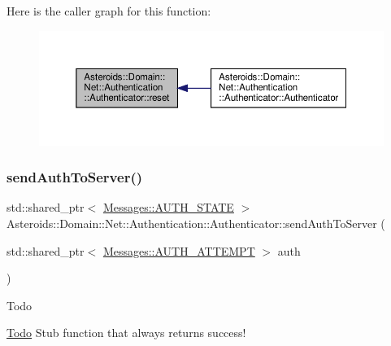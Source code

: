 Here is the caller graph for this function\+:\nopagebreak
\begin{figure}[H]
\begin{center}
\leavevmode
\includegraphics[width=350pt]{classAsteroids_1_1Domain_1_1Net_1_1Authentication_1_1Authenticator_adcb0d071c190cabc1333ab81ae2c9650_icgraph}
\end{center}
\end{figure}
\mbox{\label{classAsteroids_1_1Domain_1_1Net_1_1Authentication_1_1Authenticator_a8a8edfa95f03ea7dc5ca921f1e1ca622}} 
\subsubsection{\texorpdfstring{send\+Auth\+To\+Server()}{sendAuthToServer()}}
{\footnotesize\ttfamily std\+::shared\+\_\+ptr$<$ \hyperlink{classAsteroids_1_1Domain_1_1Net_1_1Messages_1_1AUTH__STATE}{Messages\+::\+A\+U\+T\+H\+\_\+\+S\+T\+A\+TE} $>$ Asteroids\+::\+Domain\+::\+Net\+::\+Authentication\+::\+Authenticator\+::send\+Auth\+To\+Server (\begin{DoxyParamCaption}\item[{std\+::shared\+\_\+ptr$<$ \hyperlink{classAsteroids_1_1Domain_1_1Net_1_1Messages_1_1AUTH__ATTEMPT}{Messages\+::\+A\+U\+T\+H\+\_\+\+A\+T\+T\+E\+M\+PT} $>$}]{auth }\end{DoxyParamCaption})\hspace{0.3cm}{\ttfamily [private]}}

\begin{DoxyRefDesc}{Todo}
\item[\hyperlink{todo__todo000006}{Todo}]Stub function that always returns success! \end{DoxyRefDesc}


